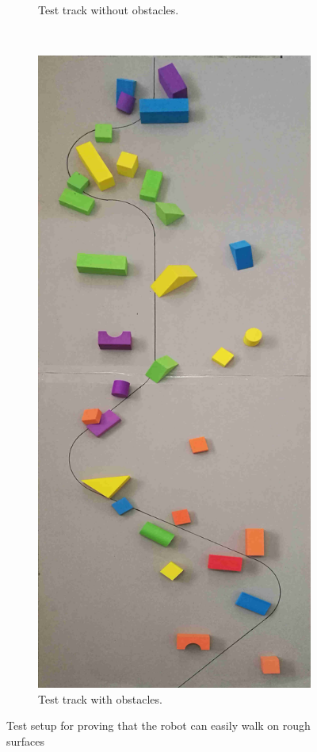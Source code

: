 \begin{figure}[H]
\begin{subfigure}[t]{0.5\textwidth}
        \caption{Test track without obstacles.}
    \end{subfigure}%
    ~ 
    \begin{subfigure}[t]{0.5\textwidth}
        \centering
        \includegraphics[scale = 1]{pics/Res4.jpg}
        \caption{Test track with obstacles.}
    \end{subfigure}
    \caption{Test setup for proving that the robot can easily walk on rough surfaces}
    \label{fig:Res4}
\end{figure}
